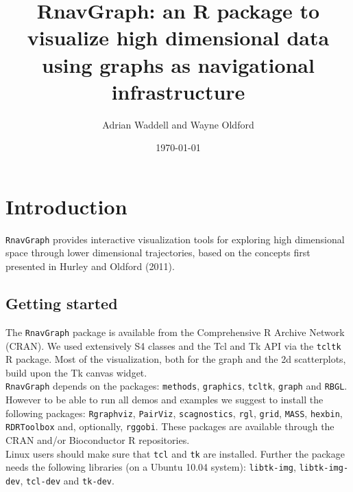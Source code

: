 \documentclass[12pt,oneside,titlepage,letter]{article}
\title{RnavGraph: an R package to visualize high dimensional data using graphs as navigational infrastructure}
\author{Adrian Waddell and Wayne Oldford}
\date{\today}
\begin{document}
\maketitle

\tableofcontents

\newpage
\section{Introduction}
\texttt{RnavGraph} provides interactive visualization tools for exploring high dimensional space through lower dimensional trajectories, based on the concepts first presented in Hurley and Oldford (2011).  

\subsection{Getting started}
The \texttt{RnavGraph}  package is available from the Comprehensive R Archive Network (CRAN). We used extensively S4 classes and the Tcl and Tk API via the \texttt{tcltk} R package. Most of the visualization, both for the graph and the 2d scatterplots, build upon the Tk canvas widget.\\

\texttt{RnavGraph} depends on the packages: \texttt{methods}, \texttt{graphics}, \texttt{tcltk}, \texttt{graph} and \texttt{RBGL}. However to be able to run all demos and examples we suggest to install the following packages: \texttt{Rgraphviz}, \texttt{PairViz}, \texttt{scagnostics}, \texttt{rgl}, \texttt{grid}, \texttt{MASS}, \texttt{hexbin}, \texttt{RDRToolbox} and, optionally, \texttt{rggobi}.   These packages are available through the CRAN and/or Bioconductor R repositories. \\

Linux users should make sure that \texttt{tcl} and \texttt{tk} are installed. Further the package needs the following libraries (on a Ubuntu 10.04 system): \texttt{libtk-img}, \texttt{libtk-img-dev}, \texttt{tcl-dev} and \texttt{tk-dev}.\\
\end{document}
